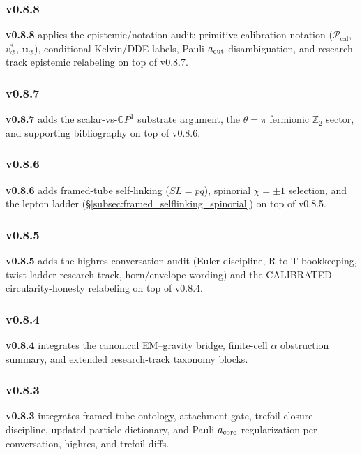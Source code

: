 \documentclass[11pt]{article}
\theoremstyle{definition}
\theoremstyle{plain}
\theoremstyle{remark}
\newcommand{\vchar}{v_{\!\boldsymbol{\circlearrowleft}}^{\ast}}
\newcommand{\uswirl}{\mathbf{u}_{\!\boldsymbol{\circlearrowleft}}}
\begin{document}
        \subsubsection{v0.8.8}
            \textbf{v0.8.8} applies the epistemic/notation audit: primitive calibration notation ($\mathcal{P}_{\mathrm{cal}}$, $\vchar$, $\uswirl$), conditional Kelvin/DDE labels, Pauli $a_{\rm cut}$ disambiguation, and research-track epistemic relabeling on top of v0.8.7.

        \subsubsection{v0.8.7}
            \textbf{v0.8.7} adds the scalar-vs-$\mathbb{C}P^1$ substrate argument, the $\theta=\pi$ fermionic $\mathbb{Z}_2$ sector, and supporting bibliography on top of v0.8.6.

        \subsubsection{v0.8.6}
            \textbf{v0.8.6} adds framed-tube self-linking ($SL=pq$), spinorial $\chi=\pm1$ selection, and the lepton ladder (\S\ref{subsec:framed_selflinking_spinorial}) on top of v0.8.5.

        \subsubsection{v0.8.5}
            \textbf{v0.8.5} adds the highres conversation audit (Euler discipline, R-to-T bookkeeping, twist-ladder research track, horn/envelope wording) and the CALIBRATED circularity-honesty relabeling on top of v0.8.4.

        \subsubsection{v0.8.4}
            \textbf{v0.8.4} integrates the canonical EM--gravity bridge, finite-cell $\alpha$ obstruction summary, and extended research-track taxonomy blocks.

        \subsubsection{v0.8.3}
            \textbf{v0.8.3} integrates framed-tube ontology, attachment gate, trefoil closure discipline, updated particle dictionary, and Pauli $a_{\rm core}$ regularization per conversation, highres, and trefoil diffs.
\end{document}
